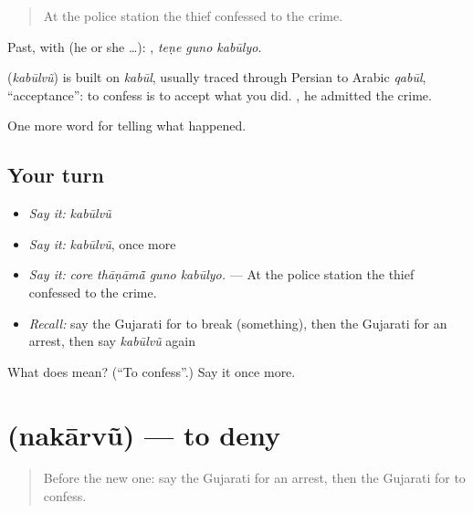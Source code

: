 \begin{quote}
At the police station the thief confessed to the crime.
\end{quote}

Past, with  (he or she …):   , \emph{teṇe guno kabūlyo}.

\begin{cousinweb}
\textbf{} (\emph{kabūlvũ}) is built on \emph{kabūl}, usually traced through Persian to Arabic \emph{qabūl}, \textquotedblleft{}acceptance\textquotedblright{}: to confess is to accept what you did. \textbf{ }, he admitted the crime.
\end{cousinweb}

\begin{grammarlens}[title={What you've built}]
One more word for telling what happened.
\end{grammarlens}

\subsection*{Your turn}
\begin{itemize}
\raggedright
  \item \emph{Say it:} \emph{kabūlvũ}
  \item \emph{Say it:} \emph{kabūlvũ}, once more
  \item \emph{Say it:} \emph{core thāṇāmā̃ guno kabūlyo.} — At the police station the thief confessed to the crime.
  \item \emph{Recall:} say the Gujarati for to break (something), then the Gujarati for an arrest, then say \emph{kabūlvũ} again
\end{itemize}

\begin{tcolorbox}[breakable,colback=teal!4,colframe=teal!35!black,title={Before you move on}]
What does  mean? (\textquotedblleft{}To confess\textquotedblright{}.) Say it once more.
\end{tcolorbox}
\section[\texorpdfstring{\gu{નકારવું} (nakārvũ)}{નકારવું (nakārvũ)}]{ (nakārvũ) — to deny}

\label{lesson:GU-C288-nakarvu}



\begin{quote}
Before the new one: say the Gujarati for an arrest, then the Gujarati for to confess.
\end{quote}

